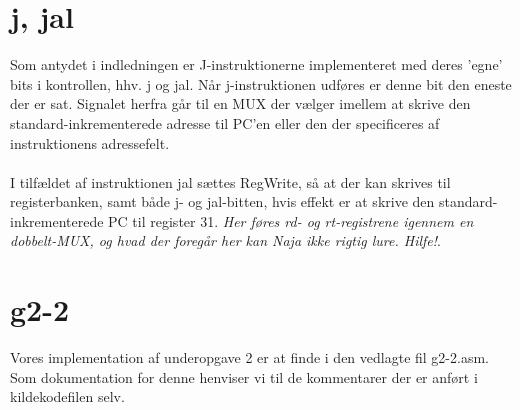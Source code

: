 \documentclass[10pt,a4paper,danish]{article}
\begin{document}
\section{j, jal}
Som antydet i indledningen er J-instruktionerne implementeret med deres 'egne' bits i kontrollen, hhv. j og jal. Når j-instruktionen udføres er denne bit den eneste der er sat. Signalet herfra går til en MUX der vælger imellem at skrive den standard-inkrementerede adresse til PC'en eller den der specificeres af instruktionens adressefelt. 

\paragraph{}
I tilfældet af instruktionen jal sættes RegWrite, så at der kan skrives til registerbanken, samt både j- og jal-bitten, hvis effekt er at skrive den standard-inkrementerede PC til register 31. \emph{Her føres rd- og rt-registrene igennem en dobbelt-MUX, og hvad der foregår her kan Naja ikke rigtig lure. Hilfe!}.

\section{g2-2}
Vores implementation af underopgave 2 er at finde i den vedlagte fil g2-2.asm. Som dokumentation for denne henviser vi til de kommentarer der er anført i kildekodefilen selv. 
\end{document}
